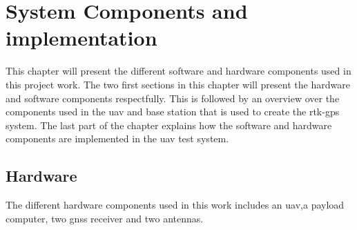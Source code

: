 
\chapter{System Components and implementation}
This chapter will present the different software and hardware components used in this project work. The two first sections in this chapter will present the hardware and software components respectfully. This is followed by an overview over the components used in the \gls{uav} and base station that is used to create the \gls{rtk-gps} system. The last part of the chapter explains how the software and hardware components are implemented in the \gls{uav} test system.
\section{Hardware}
The different hardware components used in this work includes an \gls{uav},a payload computer, two \gls{gnss} receiver and two antennas.
